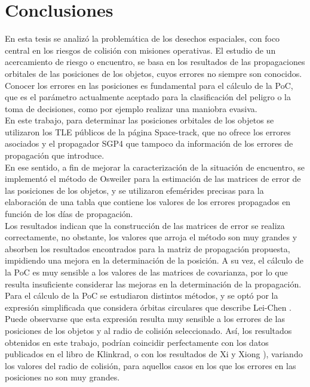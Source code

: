  \chapter{Conclusiones}
\label{chap:conclusiones}

En esta tesis se analiz\'o la problem\'atica de los desechos espaciales, con foco central en los riesgos de colisi\'on con misiones operativas. El estudio de un acercamiento de riesgo o encuentro, se basa en los resultados de las propagaciones orbitales de las posiciones de los objetos, cuyos errores no siempre son conocidos.\\

Conocer los errores en las posiciones es fundamental para el c\'alculo de la PoC, que es el par\'ametro actualmente aceptado para la clasificaci\'on del peligro o la toma de decisiones, como por ejemplo realizar una maniobra evasiva.\\ En este trabajo, para determinar las posiciones orbitales de los objetos se utilizaron los TLE p\'ublicos de la p\'agina Space-track, que no ofrece los errores asociados y el propagador SGP4 \citep{sgp4python} que tampoco da informaci\'on de los errores de propagaci\'on que introduce.\\

En ese sentido, a fin de mejorar la caracterizaci\'on de la situaci\'on de encuentro, se implement\'o el m\'etodo de Osweiler \citep{osweiler} para la estimaci\'on de las matrices de error de las posiciones de los objetos, y se utilizaron efem\'erides precisas para la elaboraci\'on de una tabla que contiene los valores de los errores propagados en funci\'on de los d\'ias de propagaci\'on.\\

Los resultados indican que la construcci\'on de las matrices de error se realiza correctamente, no obstante, los valores que arroja el m\'etodo son muy grandes y absorben los resultados encontrados para la matriz de propagaci\'on propuesta, impidiendo una mejora en la determinaci\'on de la posici\'on.  A su vez, el c\'alculo de la PoC es muy sensible a los valores de las matrices de covarianza, por lo que resulta insuficiente considerar las mejoras en la determinaci\'on de la propagaci\'on.\\

Para el c\'alculo de la PoC se estudiaron distintos m\'etodos, y se opt\'o por la expresi\'on simplificada que considera \'orbitas circulares que describe Lei-Chen \citep{leichen}. Puede observarse que esta expresi\'on resulta muy sensible a los errores de las posiciones de los objetos y al radio de colisi\'on seleccionado. As\'i, los resultados obtenidos en este trabajo, podr\'ian coincidir perfectamente con los datos publicados en el libro de  Klinkrad, \citep{Klinkrad} o con los resultados de Xi y Xiong \citep{xu2014method}), variando los valores del radio de colisi\'on, para aquellos casos en los que los errores en las posiciones no son muy grandes.

